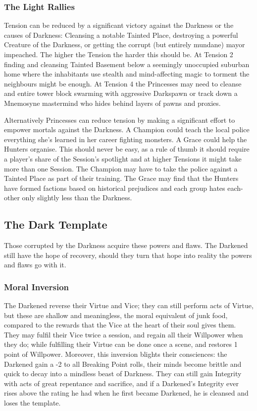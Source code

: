 \subsubsection*{The Light Rallies}

Tension can be reduced by a significant victory against the Darkness or the causes of Darkness: Cleansing a notable Tainted Place, destroying a powerful Creature of the Darkness, or getting the corrupt (but entirely mundane) mayor impeached. The higher the Tension the harder this should be. At Tension 2 finding and cleansing Tainted Basement below a seemingly unoccupied suburban home where the inhabitants use stealth and mind-affecting magic to torment the neighbours might be enough. At Tension 4 the Princesses may need to cleanse and entire tower block swarming with aggressive Darkspawn or track down a Mnemosyne mastermind who hides behind layers of pawns and proxies. 

Alternatively Princesses can reduce tension by making a significant effort to empower mortals against the Darkness. A Champion could teach the local police everything she's learned in her career fighting monsters. A Grace could help the Hunters organise. This should never be easy, as a rule of thumb it should require a player's share of the Session's spotlight and at higher Tensions it might take more than one Session. The Champion may have to take the police against a Tainted Place as part of their training. The Grace may find that the Hunters have formed factions based on historical prejudices and each group hates each-other only slightly less than the Darkness. 

\subsection*{The Dark Template}

Those corrupted by the Darkness acquire these powers and flaws. The Darkened still have the hope of recovery, should they turn that hope into reality the powers and flaws go with it. 

\subsubsection*{Moral Inversion}
The Darkened reverse their Virtue and Vice; they can still perform acts of Virtue, but these are shallow and meaningless, the moral equivalent of junk food, compared to the rewards that the Vice at the heart of their soul gives them. They may fulfil their Vice twice a session, and regain all their Willpower when they do; while fulfilling their Virtue can be done once a scene, and restores 1 point of Willpower. Moreover, this inversion blights their consciences: the Darkened gain a -2 to all Breaking Point rolls, their minds become brittle and quick to decay into a mindless beast of Darkness. They can still gain Integrity with acts of great repentance and sacrifice, and if a Darkened's Integrity ever rises above the rating he had when he first became Darkened, he is cleansed and loses the template. 

